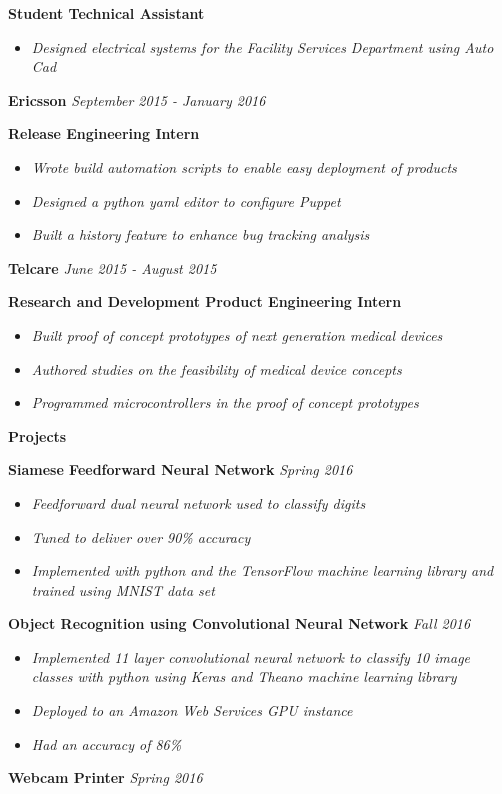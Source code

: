 \documentclass[8pt]{extarticle}
\begin{document}
\textbf{Student Technical Assistant } 
\begin{itemize}
\item \textit{Designed electrical systems for the Facility Services Department using Auto Cad}
\end{itemize}
\textbf{Ericsson} \textit{September  2015 - January 2016}

\textbf{Release Engineering Intern } 
\begin{itemize}
\item \textit{Wrote build automation scripts to enable easy deployment of products}
\item \textit{Designed a python yaml editor to configure Puppet}
\item \textit{Built a history feature to enhance bug tracking analysis}

\end{itemize}
\textbf{Telcare} \textit{June  2015 - August 2015}

\textbf{Research and Development Product Engineering Intern} 
\begin{itemize}
\item \textit{Built proof of concept prototypes of next generation medical devices}
\item \textit{Authored studies on the feasibility of medical device concepts}
\item \textit{Programmed microcontrollers in the proof of concept prototypes}

\end{itemize}
\begin{changemargin}{-0.8cm}{0.0cm}
\textbf{Projects}
\end{changemargin}
\vspace*{-0.4cm}
\makebox[\linewidth]{\rule{17cm}{0.4pt}}
\textbf{Siamese Feedforward Neural Network}  \textit{Spring 2016}

\begin{itemize}
\item \textit{Feedforward dual neural network used to classify digits}
\item \textit{Tuned to deliver over 90\% accuracy}
\item \textit{Implemented with python and the TensorFlow machine learning library and trained using MNIST data set}

\end{itemize}
\textbf{Object Recognition using Convolutional Neural Network}  \textit{Fall 2016}

\begin{itemize}
\item \textit{Implemented 11 layer convolutional neural network to classify 10 image classes with python using Keras and Theano machine learning library}
\item \textit{Deployed to an Amazon Web Services GPU instance}
\item \textit{Had an accuracy of 86\%}

\end{itemize}
\textbf{Webcam Printer}  \textit{Spring 2016}
\end{document}
